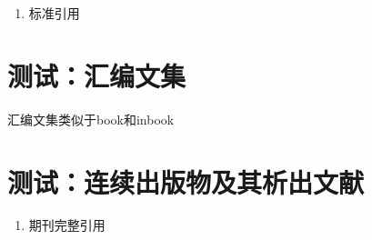 \begin{refsection}

\begin{enumerate}
  \item 标准引用\cite{国家标准局信息分类编码研究所1988-59-92,国家环境保护局科技标准司1996-2-3, 全国广播电视标准化技术委员会2007-1-1,全国文献工作标准化委员会第七分委员会1986--,全国信息文献标准化技术委员会2010-3-3, 中华人民共和国国家质量监督检验检疫总局2015,standardinfoiso158}
\end{enumerate}
\printbibliography[heading=bibliography,title=【标准】]
\end{refsection}


\section{测试：汇编文集}
\begin{refsection}
汇编文集类似于book和inbook\cite{韩吉人1985-90-99}\cite{中国职工教育研究会1985--}

{
\printbibliography%
}

\end{refsection}

\section{测试：连续出版物及其析出文献}
\begin{refsection}

\begin{enumerate}
  \item 期刊完整引用\cite{中国地质学会1936--,中国图书馆学会1957--,AAAS1883--,中华医学会湖北分会1984--}
\end{enumerate}

\printbibliography[heading=bibliography,title=【连续出版物】]
\end{refsection}

